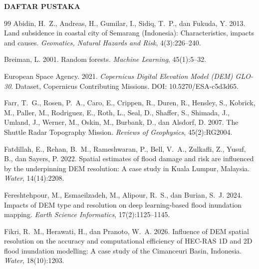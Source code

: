 \documentclass[12pt,a4paper]{article}
\begin{document}
\clearpage
{}
{}
\thispagestyle{plain}
{\centering\large\bfseries DAFTAR PUSTAKA\par}
\vspace{1.5em}
\begingroup
\singlespacing
\renewcommand{\section}[2]{}
\setlength{\bibhang}{2em}
\setlength{\bibsep}{0.65em}
\begin{thebibliography}{99}
 Abidin, H.~Z., Andreas, H., Gumilar, I., Sidiq, T.~P., dan Fukuda, Y. 2013. Land subsidence in coastal city of Semarang (Indonesia): Characteristics, impacts and causes. \textit{Geomatics, Natural Hazards and Risk}, 4(3):226--240.

 Breiman, L. 2001. Random forests. \textit{Machine Learning}, 45(1):5--32.

 European Space Agency. 2021. \textit{Copernicus Digital Elevation Model (DEM) GLO-30}. Dataset, Copernicus Contributing Missions. DOI: 10.5270/ESA-c5d3d65.

 Farr, T.~G., Rosen, P.~A., Caro, E., Crippen, R., Duren, R., Hensley, S., Kobrick, M., Paller, M., Rodriguez, E., Roth, L., Seal, D., Shaffer, S., Shimada, J., Umland, J., Werner, M., Oskin, M., Burbank, D., dan Alsdorf, D. 2007. The Shuttle Radar Topography Mission. \textit{Reviews of Geophysics}, 45(2):RG2004.

 Fatdillah, E., Rehan, B.~M., Rameshwaran, P., Bell, V.~A., Zulkafli, Z., Yusuf, B., dan Sayers, P. 2022. Spatial estimates of flood damage and risk are influenced by the underpinning DEM resolution: A case study in Kuala Lumpur, Malaysia. \textit{Water}, 14(14):2208.

 Fereshtehpour, M., Esmaeilzadeh, M., Alipour, R.~S., dan Burian, S.~J. 2024. Impacts of DEM type and resolution on deep learning-based flood inundation mapping. \textit{Earth Science Informatics}, 17(2):1125--1145.

 Fikri, R.~M., Herawati, H., dan Pranoto, W.~A. 2026. Influence of DEM spatial resolution on the accuracy and computational efficiency of HEC-RAS 1D and 2D flood inundation modelling: A case study of the Cimanceuri Basin, Indonesia. \textit{Water}, 18(10):1203.


\end{thebibliography}
\end{document}
